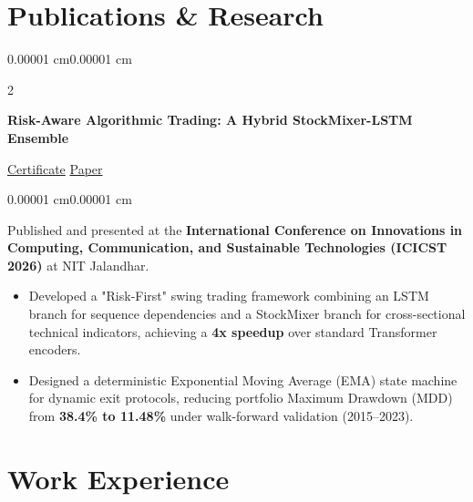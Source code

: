 \documentclass[10pt, letterpaper]{article}
\newenvironment{highlights}{
    \begin{itemize}[
        topsep=0.10 cm,
        parsep=0.10 cm,
        partopsep=0pt,
        itemsep=0pt,
        leftmargin=10pt
    ]
}{
    \end{itemize}
}
\newenvironment{onecolentry}{
    \begin{adjustwidth}{0.00001 cm}{0.00001 cm}
}{
    \end{adjustwidth}
}
\newenvironment{twocolentry}[2][]{
    \onecolentry
    \def\secondColumn{#2}
    \setcolumnwidth{\fill, 4.5 cm}
    \begin{paracol}{2}
}{
    \switchcolumn \raggedleft \secondColumn
    \end{paracol}
    \endonecolentry
}
\begin{document}
\vspace{0.15 cm}

\section{\textcolor{myblue}{\textbf{Publications \& Research}}}

\begin{twocolentry}{\href{https://github.com/Verma-Rohil/skill-genome-platform/blob/main/docs/publications/Certificate.pdf}{\textcolor{myblue}{\faIcon{file-pdf} Certificate}} \AND \href{https://github.com/Verma-Rohil/skill-genome-platform/blob/main/docs/publications/Conf_ICICST.pdf}{\textcolor{myblue}{\faIcon{link} Paper}}}
\textbf{Risk-Aware Algorithmic Trading: A Hybrid StockMixer-LSTM Ensemble}
\end{twocolentry}

\vspace{0.06cm}

\begin{onecolentry}
Published and presented at the \textbf{International Conference on Innovations in Computing, Communication, and Sustainable Technologies (ICICST 2026)} at NIT Jalandhar.
\begin{highlights}
\item Developed a "Risk-First" swing trading framework combining an LSTM branch for sequence dependencies and a StockMixer branch for cross-sectional technical indicators, achieving a \textbf{4x speedup} over standard Transformer encoders.
\item Designed a deterministic Exponential Moving Average (EMA) state machine for dynamic exit protocols, reducing portfolio Maximum Drawdown (MDD) from \textbf{38.4\% to 11.48\%} under walk-forward validation (2015--2023).
\end{highlights}
\end{onecolentry}

\vspace{0.15 cm}

\section{\textcolor{myblue}{\textbf{Work Experience}}}
\end{document}
